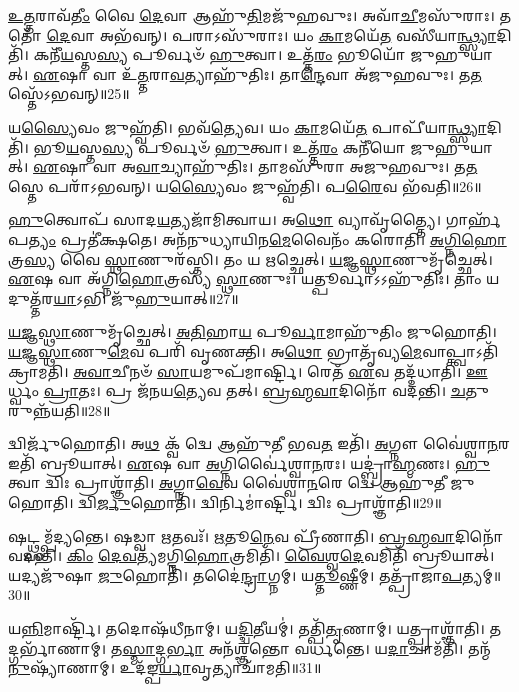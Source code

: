 \-\ul{𑌉}\-\-\ul{𑌤𑍍𑌤}\-𑌰𑌾𑌵᳴\-\ul{𑌤𑍀𑌂} 𑌵𑍈 \ul{𑌦𑍇}\-𑌵𑌾 𑌆𑌹𑍁᳴\-\ul{𑌤𑌿}\-𑌮𑌜𑍁᳴𑌹𑌵𑍁𑌃।
𑌅𑌵𑌾᳴\-\ul{𑌚𑍀}\-𑌮𑌸𑍁᳴𑌰𑌾𑌃।
𑌤𑌤𑍋᳴ \ul{𑌦𑍇}\-𑌵𑌾 𑌅𑌭᳴𑌵𑌨𑍍।
𑌪𑌰𑌾𑌽𑌸𑍁᳴𑌰𑌾𑌃।
𑌯𑌂 \ul{𑌕𑌾}\-𑌮𑌯𑍇᳴\-\ul{𑌤} 𑌵𑌸𑍀᳴𑌯𑌾\-\ul{𑌨𑍍𑌥𑍍𑌸𑍍𑌯𑌾}\-𑌦𑌿𑌤𑌿᳴।
𑌕𑌨𑍀᳴\-\ul{𑌯}\-𑌸𑍍𑌤\-\ul{𑌸𑍍𑌯} 𑌪𑍂𑌰𑍍𑌵𑍞᳴ \ul{𑌹𑍁}\-𑌤𑍍𑌵𑌾।
𑌉𑌤𑍍𑌤᳴\-\ul{𑌰𑌂} 𑌭𑍂𑌯𑍋᳴ 𑌜𑍁𑌹𑍁𑌯𑌾𑌤𑍍।
\-\ul{𑌏}\-𑌷𑌾 𑌵𑌾 𑌉᳴\-\ul{𑌤𑍍𑌤}\-𑌰𑌾\-\ul{𑌵}\-𑌤𑍍𑌯𑌾𑌹𑍁᳴𑌤𑌿𑌃।
𑌤𑌾\-\ul{𑌨𑍍𑌦𑍇}\-𑌵𑌾 𑌅᳴𑌜𑍁𑌹𑌵𑍁𑌃।
𑌤\-\ul{𑌤}\-𑌸𑍍𑌤𑍇᳴\-𑌽𑌭𑌵𑌨𑍍॥25॥

𑌯\-\ul{𑌸𑍍𑌯𑍈}\-𑌵𑌂 𑌜𑍁𑌹𑍍𑌵᳴𑌤𑌿।
𑌭𑌵᳴\-\ul{𑌤𑍍𑌯𑍇}\-𑌵।
𑌯𑌂 \ul{𑌕𑌾}\-𑌮𑌯𑍇᳴\-\ul{𑌤} 𑌪𑌾𑌪𑍀᳴𑌯𑌾\-\ul{𑌨𑍍𑌥𑍍𑌸𑍍𑌯𑌾}\-𑌦𑌿𑌤𑌿᳴।
𑌭𑍂\-\ul{𑌯}\-𑌸𑍍𑌤\-\ul{𑌸𑍍𑌯} 𑌪𑍂𑌰𑍍𑌵𑍞᳴ \ul{𑌹𑍁}\-𑌤𑍍𑌵𑌾।
𑌉𑌤𑍍𑌤᳴\-\ul{𑌰𑌂} 𑌕𑌨𑍀᳴𑌯𑍋 𑌜𑍁𑌹𑍁𑌯𑌾𑌤𑍍।
\-\ul{𑌏}\-𑌷𑌾 𑌵𑌾 𑌅\-\ul{𑌵𑌾}\-𑌚𑍍𑌯𑌾𑌹𑍁᳴𑌤𑌿𑌃।
𑌤𑌾𑌮𑌸𑍁᳴𑌰𑌾 𑌅𑌜𑍁𑌹𑌵𑍁𑌃।
𑌤\-\ul{𑌤}\-𑌸𑍍𑌤𑍇 𑌪𑌰𑌾᳴\-𑌽𑌭𑌵𑌨𑍍।
𑌯\-\ul{𑌸𑍍𑌯𑍈}\-𑌵𑌂 𑌜𑍁𑌹𑍍𑌵᳴𑌤𑌿।
𑌪\-\ul{𑌰𑍈}\-𑌵 𑌭᳴𑌵𑌤𑌿॥26॥

\-\ul{𑌹𑍁}\-𑌤𑍍𑌵𑍋𑌪᳴ 𑌸𑌾𑌦\-\ul{𑌯}\-𑌤𑍍𑌯𑌜𑌾᳴𑌮𑌿𑌤𑍍𑌵𑌾𑌯।
𑌅\-\ul{𑌥𑍋} 𑌵𑍍𑌯𑌾𑌵𑍃᳴𑌤𑍍𑌤𑍍𑌯𑍈।
𑌗𑌾𑌰𑍍\mbox{}𑌹᳴𑌪\-\ul{𑌤𑍍𑌯𑌂} 𑌪𑍍𑌰𑌤𑍀॑𑌕𑍍𑌷𑌤𑍇।
𑌅𑌨᳴𑌨𑍁𑌧𑍍𑌯𑌾𑌯𑌿𑌨\-\ul{𑌮𑍇}\-𑌵𑍈𑌨𑌂᳴ 𑌕𑌰𑍋𑌤𑌿।
\-\ul{𑌅}\-\-\ul{𑌗𑍍𑌨𑌿}\-\-\ul{𑌹𑍋}\-𑌤𑍍𑌰\-\ul{𑌸𑍍𑌯} 𑌵𑍈 \ul{𑌸𑍍𑌥𑌾}\-𑌣𑍁𑌰᳴𑌸𑍍𑌤𑌿।
𑌤𑌂 𑌯 \ul{𑌋}\-𑌚𑍍𑌛𑍇𑌤𑍍।
\-\ul{𑌯}\-\-\ul{𑌜𑍍𑌞}\-\-\ul{𑌸𑍍𑌥𑌾}\-𑌣𑍁𑌮𑍃᳴𑌚𑍍𑌛𑍇𑌤𑍍।
\-\ul{𑌏}\-𑌷 𑌵𑌾 𑌅᳴𑌗𑍍𑌨𑌿\-\ul{𑌹𑍋}\-𑌤𑍍𑌰𑌸𑍍𑌯᳴ \ul{𑌸𑍍𑌥𑌾}\-𑌣𑍁𑌃।
𑌯𑌤𑍍𑌪𑍂𑌰𑍍𑌵𑌾\-𑌽𑌽𑌹𑍁᳴𑌤𑌿𑌃।
𑌤𑌾𑌂 𑌯𑌦𑍁𑌤𑍍𑌤᳴𑌰\-\ul{𑌯𑌾}\-𑌽𑌭𑌿 𑌜𑍁᳴\-\ul{𑌹𑍁}\-𑌯𑌾𑌤𑍍॥27॥

\-\ul{𑌯}\-\-\ul{𑌜𑍍𑌞}\-\-\ul{𑌸𑍍𑌥𑌾}\-𑌣𑍁𑌮𑍃᳴𑌚𑍍𑌛𑍇𑌤𑍍।
\-\ul{𑌅}\-\-\ul{𑌤𑌿}\-𑌹𑌾\-\ul{𑌯} 𑌪𑍂\-\ul{𑌰𑍍𑌵𑌾}\-𑌮𑌾𑌹𑍁᳴𑌤𑌿𑌂 𑌜𑍁𑌹𑍋𑌤𑌿।
\-\ul{𑌯}\-\-\ul{𑌜𑍍𑌞}\-\-\ul{𑌸𑍍𑌥𑌾}\-𑌣𑍁\-\ul{𑌮𑍇}\-𑌵 𑌪𑌰𑌿᳴ 𑌵𑍃𑌣𑌕𑍍𑌤𑌿।
𑌅\-\ul{𑌥𑍋} 𑌭𑍍𑌰𑌾𑌤𑍃᳴𑌵𑍍𑌯\-\ul{𑌮𑍇}\-𑌵𑌾𑌪𑍍𑌤𑍍𑌵𑌾𑌽𑌤𑌿᳴ 𑌕𑍍𑌰𑌾𑌮𑌤𑌿।
\-\ul{𑌅}\-\-\ul{𑌵𑌾}\-𑌚𑍀𑌨𑍞᳴ \ul{𑌸𑌾}\-𑌯𑌮𑍁𑌪᳴𑌮𑌾𑌰𑍍𑌷𑍍𑌟𑌿।
𑌰𑍇𑌤᳴ \ul{𑌏}\-𑌵 𑌤𑌦𑍍𑌦᳴𑌧𑌾𑌤𑌿।
\-\ul{𑌊}\-𑌰𑍍𑌧𑍍𑌵𑌂 \ul{𑌪𑍍𑌰𑌾}\-𑌤𑌃।
𑌪𑍍𑌰 𑌜᳴𑌨𑌯\-\ul{𑌤𑍍𑌯𑍇}\-𑌵 𑌤𑌤𑍍।
\-\ul{𑌬𑍍𑌰}\-\-\ul{𑌹𑍍𑌮}\-\-\ul{𑌵𑌾}\-𑌦𑌿𑌨𑍋᳴ 𑌵𑌦𑌨𑍍𑌤𑌿।
\-\ul{𑌚}\-𑌤𑍁𑌰𑍁𑌨𑍍𑌨᳴𑌯𑌤𑌿॥28॥

𑌦𑍍𑌵𑌿𑌰𑍍𑌜𑍁᳴𑌹𑍋𑌤𑌿।
𑌅\-\ul{𑌥} 𑌕𑍍𑌵᳴ 𑌦𑍍𑌵𑍇 𑌆𑌹𑍁᳴𑌤𑍀 𑌭𑌵\-\ul{𑌤} 𑌇𑌤𑌿᳴।
\-\ul{𑌅}\-𑌗𑍍𑌨𑍗 𑌵𑍈॑𑌶𑍍𑌵𑌾\-\ul{𑌨}\-𑌰 𑌇𑌤𑌿᳴ 𑌬𑍍𑌰𑍂𑌯𑌾𑌤𑍍।
\-\ul{𑌏}\-𑌷 𑌵𑌾 \ul{𑌅}\-𑌗𑍍𑌨𑌿𑌰𑍍𑌵𑍈॑𑌶𑍍𑌵𑌾\-\ul{𑌨}\-𑌰𑌃।
𑌯𑌦𑍍𑌬𑍍𑌰𑌾॑\-\ul{𑌹𑍍𑌮}\-𑌣𑌃।
\-\ul{𑌹𑍁}\-𑌤𑍍𑌵𑌾 𑌦𑍍𑌵𑌿𑌃 𑌪𑍍𑌰𑌾𑌶𑍍𑌞𑌾᳴𑌤𑌿।
\-\ul{𑌅}\-𑌗𑍍𑌨𑌾\-\ul{𑌵𑍇}\-𑌵 𑌵𑍈॑𑌶𑍍𑌵𑌾\-\ul{𑌨}\-𑌰𑍇 𑌦𑍍𑌵𑍇 𑌆𑌹𑍁᳴𑌤𑍀 𑌜𑍁𑌹𑍋𑌤𑌿।
𑌦𑍍𑌵𑌿\-\ul{𑌰𑍍𑌜𑍁}\-𑌹𑍋𑌤𑌿᳴।
𑌦𑍍𑌵𑌿𑌰𑍍𑌨𑌿𑌮𑌾॑𑌰𑍍𑌷𑍍𑌟𑌿।
𑌦𑍍𑌵𑌿𑌃 𑌪𑍍𑌰𑌾𑌶𑍍𑌞𑌾᳴𑌤𑌿॥29॥

𑌷𑌟𑍍𑌥𑍍𑌸𑌮𑍍𑌪᳴𑌦𑍍𑌯𑌨𑍍𑌤𑍇।
𑌷𑌡𑍍𑌵𑌾 \ul{𑌋}\-𑌤𑌵𑌃᳴।
\-\ul{𑌋}\-𑌤𑍂\-\ul{𑌨𑍇}\-𑌵 𑌪𑍍𑌰𑍀᳴𑌣𑌾𑌤𑌿।
\-\ul{𑌬𑍍𑌰}\-\-\ul{𑌹𑍍𑌮}\-\-\ul{𑌵𑌾}\-𑌦𑌿𑌨𑍋᳴ 𑌵𑌦𑌨𑍍𑌤𑌿।
\-\ul{𑌕𑌿𑌂} \ul{𑌦𑍇}\-\-\ul{𑌵}\-𑌤𑍍𑌯᳴𑌮𑌗𑍍𑌨𑌿\-\ul{𑌹𑍋}\-𑌤𑍍𑌰𑌮𑌿𑌤𑌿᳴।
\-\ul{𑌵𑍈}\-\-\ul{𑌶𑍍𑌵}\-\-\ul{𑌦𑍇}\-𑌵𑌮𑌿𑌤𑌿᳴ 𑌬𑍍𑌰𑍂𑌯𑌾𑌤𑍍।
𑌯𑌦𑍍𑌯𑌜𑍁᳴𑌷𑌾 \ul{𑌜𑍁}\-𑌹𑍋𑌤𑌿᳴।
𑌤𑌦𑍈॑\-\ul{𑌨𑍍𑌦𑍍𑌰𑌾}\-𑌗𑍍𑌨𑌮𑍍।
𑌯\-\ul{𑌤𑍍𑌤𑍂}\-𑌷𑍍𑌣𑍀𑌮𑍍।
𑌤𑌤𑍍𑌪𑍍𑌰𑌾᳴𑌜𑌾\-\ul{𑌪}\-𑌤𑍍𑌯𑌮𑍍॥30॥

𑌯\-\ul{𑌨𑍍𑌨𑌿}\-𑌮𑌾𑌰𑍍𑌷𑍍𑌟𑌿᳴।
𑌤𑌦𑍋𑌷᳴𑌧𑍀𑌨𑌾𑌮𑍍।
𑌯\-\ul{𑌦𑍍𑌦𑍍𑌵𑌿}\-𑌤𑍀𑌯𑌮𑍍॑।
𑌤𑌤𑍍𑌪𑌿᳴\-\ul{𑌤𑍃}\-𑌣𑌾𑌮𑍍।
𑌯𑌤𑍍𑌪𑍍𑌰𑌾𑌶𑍍𑌞𑌾᳴𑌤𑌿।
𑌤𑌦𑍍𑌗𑌰𑍍𑌭𑌾᳴𑌣𑌾𑌮𑍍।
𑌤\-\ul{𑌸𑍍𑌮𑌾}\-𑌦𑍍𑌗\-\ul{𑌰𑍍𑌭𑌾} 𑌅𑌨᳴𑌶𑍍𑌞𑌨𑍍𑌤𑍋 𑌵𑌰𑍍𑌧𑌨𑍍𑌤𑍇।
𑌯\-\ul{𑌦𑌾}\-𑌚𑌾𑌮᳴𑌤𑌿।
𑌤𑌨𑍍𑌮᳴\-\ul{𑌨𑍁}\-𑌷𑍍𑌯𑌾᳴𑌣𑌾𑌮𑍍।
𑌉𑌦᳴𑌙𑍍𑌪\-\ul{𑌰𑍍𑌯𑌾}\-𑌵𑍃𑌤𑍍𑌯𑌾𑌚𑌾᳴𑌮𑌤𑌿॥31॥

